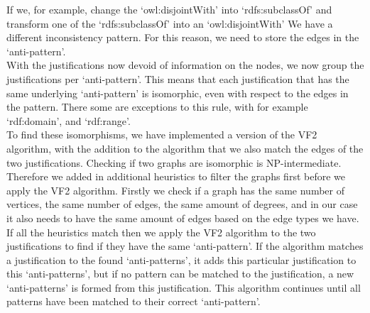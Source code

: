 \documentclass[11pt,letterpaper ,oneside ]{book}
\begin{document}
	If we, for example, change the `owl:disjointWith' into `rdfs:subclassOf' and transform one of the `rdfs:subclassOf' into an `owl:disjointWith' We have a different inconsistency pattern. For this reason, we need to store the edges in the `anti-pattern'.\\
	With the justifications now devoid of information on the nodes, we now group the justifications per `anti-pattern'. This means that each justification that has the same underlying `anti-pattern' is isomorphic, even with respect to the edges in the pattern. There some are exceptions to this rule, with for example `rdf:domain', and `rdf:range'.\\
	To find these isomorphisms, we have implemented a version of the VF2 algorithm\cite{LCordella:2004}, with the addition to the algorithm that we also match the edges of the two justifications. Checking if two graphs are isomorphic is NP-intermediate. Therefore we added in additional heuristics to filter the graphs first before we apply the VF2 algorithm. Firstly we check if a graph has the same number of vertices, the same number of edges, the same amount of degrees, and in our case it also needs to have the same amount of edges based on the edge types we have. If all the heuristics match then we apply the VF2 algorithm to the two justifications to find if they have the same `anti-pattern'. If the algorithm matches a justification to the found `anti-patterns', it adds this particular justification to this `anti-patterns', but if no pattern can be matched to the justification, a new `anti-patterns' is formed from this justification. This algorithm continues until all patterns have been matched to their correct `anti-pattern'.\\
	
\end{document}
